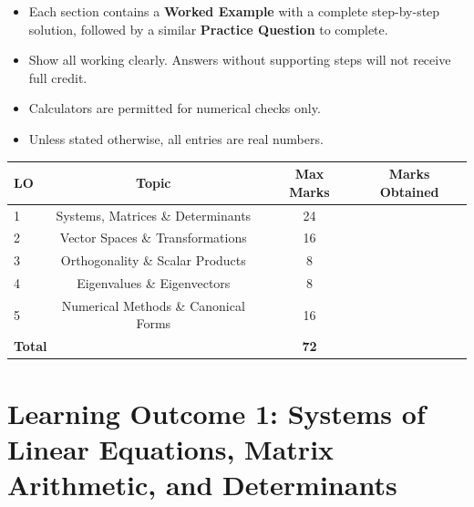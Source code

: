 \documentclass[12pt,a4paper]{article}
\begin{document}
\begin{titlepage}
		\begin{tcolorbox}[colback=gray!8, colframe=gray!50, width=0.9\textwidth,
			fonttitle=\bfseries, title={Instructions}]
			\begin{itemize}[nosep]
				\item Each section contains a \textbf{Worked Example} with a complete step-by-step
				solution, followed by a similar \textbf{Practice Question} to complete.
				\item Show all working clearly. Answers without supporting steps will not receive full credit.
				\item Calculators are permitted for numerical checks only.
				\item Unless stated otherwise, all entries are real numbers.
			\end{itemize}
			\vspace{0.5em}
			\begin{center}
				\begin{tabular}{lccc}
					\toprule
					\textbf{LO} & \textbf{Topic} & \textbf{Max Marks} & \textbf{Marks Obtained} \\
					\midrule
					1 & Systems, Matrices \& Determinants & 24 & \underline{\hspace{2cm}} \\
					2 & Vector Spaces \& Transformations  & 16 & \underline{\hspace{2cm}} \\
					3 & Orthogonality \& Scalar Products  &  8 & \underline{\hspace{2cm}} \\
					4 & Eigenvalues \& Eigenvectors       &  8 & \underline{\hspace{2cm}} \\
					5 & Numerical Methods \& Canonical Forms & 16 & \underline{\hspace{2cm}} \\
					\midrule
					\multicolumn{2}{l}{\textbf{Total}} & \textbf{72} & \underline{\hspace{2cm}} \\
					\bottomrule
				\end{tabular}
			\end{center}
		\end{tcolorbox}
	\end{titlepage}
	
	\tableofcontents
	\newpage
	
	\section{Learning Outcome 1: Systems of Linear Equations, Matrix Arithmetic, and Determinants}
	
\end{document}
